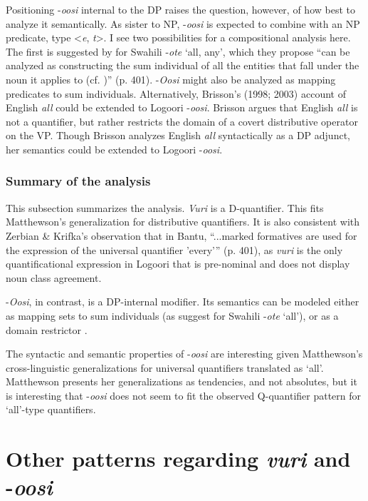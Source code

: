 \documentclass[output=paper]{langsci/langscibook}
\begin{document}
Positioning -\textit{oosi} internal to the DP raises the question, however, of how best to analyze it semantically. As sister to NP, -\textit{oosi} is expected to combine with an NP predicate, type <\textit{e},\textit{ t}>. I see two possibilities for a compositional analysis here. The first is suggested by \citet{ZerbianKrifka2008} for Swahili -\textit{ote} ‘all, any’, which they propose “can be analyzed as constructing the sum individual of all the entities that fall under the noun it applies to (cf. \citealt{Link1983})” (p. 401). -\textit{Oosi} might also be analyzed as mapping predicates to sum individuals. Alternatively, Brisson’s (1998; 2003) account of English \textit{all} could be extended to Logoori -\textit{oosi}. Brisson argues that English \textit{all} is not a quantifier, but rather restricts the domain of a covert distributive operator on the VP. Though Brisson analyzes English \textit{all} syntactically as a DP adjunct, her semantics could be extended to Logoori -\textit{oosi}. 

\subsubsection{Summary of the analysis}

This subsection summarizes the analysis. \textit{Vuri} is a D-quantifier. This fits Matthewson's generalization for distributive quantifiers. It is also consistent with Zerbian \& Krifka's observation that in Bantu, “...marked formatives are used for the expression of the universal quantifier 'every'” (p. 401), as \textit{vuri} is the only quantificational expression in Logoori that is pre-nominal and does not display noun class agreement. 

-\textit{Oosi}, in contrast, is a DP-internal modifier. Its semantics can be modeled either as mapping sets to sum individuals (as \citealt{ZerbianKrifka2008} suggest for Swahili -\textit{ote} ‘all’), or as a domain restrictor \citep{Brisson1998,Brisson2003}. 

The syntactic and semantic properties of -\textit{oosi} are interesting given Matthewson's cross-linguistic generalizations for universal quantifiers translated as ‘all’. Matthewson presents her generalizations as tendencies, and not absolutes, but it is interesting that -\textit{oosi} does not seem to fit the observed Q-quantifier pattern for ‘all’-type quantifiers. 

\section{Other patterns regarding \textit{vuri} and -\textit{oosi}}\label{sec:landman:4}
\end{document}
